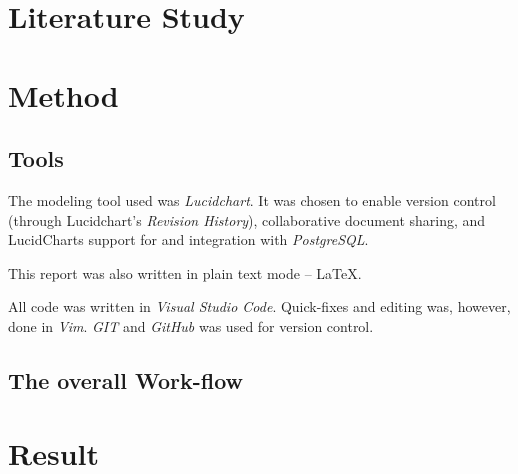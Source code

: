 \documentclass[a4paper]{scrartcl}
\begin{document}
\section{Literature Study}

\clearpage
\section{Method}
\label{sec:method}


\subsection*{Tools}
The modeling tool used was \emph{Lucidchart}.
It was chosen to enable version control (through Lucidchart's \emph{Revision History}),
collaborative document sharing, and LucidCharts support for and integration with
\emph{PostgreSQL}.

This report was also written in plain text mode -- \LaTeX.

All code was written in \emph{Visual Studio Code}.
Quick-fixes and editing was, however, done in \emph{Vim}. 
\emph{GIT} and \emph{GitHub} was used for version control.

\subsection*{The overall Work-flow}

\pagebreak
\section{Result}


\end{document}
